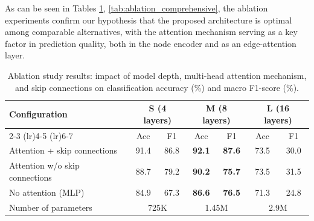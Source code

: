\documentclass[energies,article,submit,pdftex,moreauthors]{Definitions/mdpi}
\begin{document}
As can be seen in Tables \ref{tab:ablation_depth},
\ref{tab:ablation_comprehensive}, the ablation experiments confirm our
hypothesis that the proposed architecture is optimal among comparable
alternatives, with the attention mechanism serving as a key factor in
prediction quality, both in the node encoder and as an edge-attention layer.
\begin{table}[H]
	\centering
	\begin{tabularx}{\textwidth}{lcccccc}
		\toprule
		\textbf{Configuration}         & \multicolumn{2}{c}{\textbf{S (4 layers)}} & \multicolumn{2}{c}{\textbf{M (8 layers)}} & \multicolumn{2}{c}{\textbf{L (16 layers)}}                 \\
		\cmidrule(lr){2-3} \cmidrule(lr){4-5} \cmidrule(lr){6-7}
		                               & Acc                                       & F1                                        & Acc                                        & F1 & Acc & F1 \\
		\midrule
		Attention + skip connections   & 91.4                                      & 86.8                                      &
		\textbf{92.1}                  & \textbf{ 87.6}                            & 73.5                                      & 30.0                                                       \\
		Attention w/o skip connections & 88.7                                      & 79.2                                      &
		\textbf{90.2}                  & \textbf{75.7}                             & 73.5                                      & 31.5                                                       \\
		No attention (MLP)             & 84.9                                      & 67.3                                      &
		\textbf{86.6}                  & \textbf{76.5}                             & 71.3                                      & 24.8                                                       \\
		\hline
		Number of parameters           & \multicolumn{2}{c}{725K}                  & \multicolumn{2}{c}{1.45M}                 & \multicolumn{2}{c}{2.9M}                                   \\
		\bottomrule
	\end{tabularx}
	\caption{Ablation study results: impact of model depth, multi-head attention mechanism, and skip connections on classification accuracy (\%) and macro F1-score (\%).}
	\label{tab:ablation_depth}
\end{table}
\end{document}
